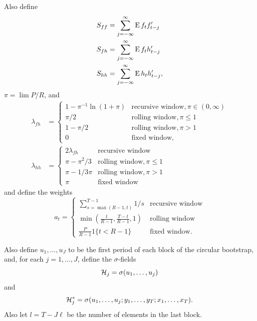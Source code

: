 \documentclass[12pt,fleqn]{article}
\begin{document}
Also define
\begin{align*}
  S_{ff} &= \sum_{j=-\infty}^\infty \operatorname{E} f_t f_{t-j}' \\
  S_{fh} &= \sum_{j=-\infty}^\infty \operatorname{E} f_t h_{t-j}' \\
  S_{hh} &= \sum_{j=-\infty}^\infty \operatorname{E} h_t h_{t-j}',
\end{align*}
$\pi = \lim P/R$, and
\begin{align*}
  \lambda_{fh} &=
  \begin{cases}
    1 - \pi^{-1} \ln(1 + \pi) & \text{recursive window}, \pi \in (0, \infty) \\
    \pi / 2 & \text{rolling window}, \pi \leq 1 \\
    1 - \pi / 2 & \text{rolling window}, \pi > 1 \\
    0 & \text{fixed window},
  \end{cases} \\
  \lambda_{hh} &=
  \begin{cases}
    2 \lambda_{fh} & \text{recursive window} \\
    \pi - \pi^2/3 & \text{rolling window}, \pi \leq 1 \\
    \pi - 1/3\pi & \text{rolling window} , \pi > 1 \\
    \pi & \text{fixed window}
  \end{cases}
\end{align*}
and define the weights
\begin{equation}\label{eq:1}
  a_t =
  \begin{cases}
    \sum_{s=\max(R-1, t)}^{T-1} 1/s & \text{recursive window} \\
    \min(\tfrac{t}{R-1}, \tfrac{T - t}{R-1}, 1) & \text{rolling window} \\
    \tfrac{P}{R-1} 1\{t < R-1\} &  \text{fixed window}.
  \end{cases}
\end{equation}

Also define $u_1,\dots,u_J$ to be the first period of each
block of the circular bootstrap, and, for each $j = 1,\dots,J$,
define the $\sigma$-fields
\[
\mathcal{H}_j = \sigma(u_1,\dots,u_j)
\]
and
\[
\mathcal{H}_j^* = \sigma(u_1,\dots,u_j; y_1,\dots,y_T; x_1,\dots,x_T).
\]
Also let $l = T - J \ell$ be the number of elements in the last block.

\newcommand{\WesA}[1][]{\oclt{t}
  (F_t^{#1} - \E^{#1} F_t^{#1}) B^{#1} H_t^{#1}}
\newcommand{\WesB}[1][]{\tfrac{1}{\sqrt{P}} \E^{#1} F_t^{#1} \osum{t} (B_t^{#1} -
  B^{#1}) H_t^{#1}}
\newcommand{\WesC}[1][]{\oclt{t}
  (F_t^{#1} - \E^{#1} F_t^{#1}) (B_t^{#1} - B^{#1}) H_t^{#1}}
\end{document}
